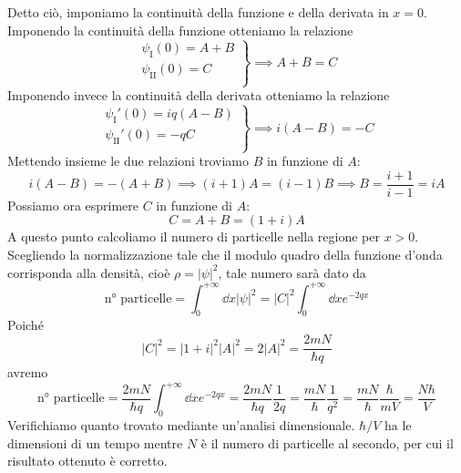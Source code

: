 \begin{soluzione}
   Detto ciò, imponiamo la continuità della funzione e della derivata in $x=0$. Imponendo la continuità della funzione otteniamo la relazione
   \begin{equation*}
      \left.
      \begin{aligned}
         \psi_{\text{I}}(0)=A+B\\
         \psi_{\text{II}}(0)=C\\
    \end{aligned}
    \right\}
    \implies
    A+B=C
  \end{equation*}
  Imponendo invece la continuità della derivata otteniamo la relazione
   \begin{equation*}
      \left.
      \begin{aligned}
         \psi_{\text{I}}'(0)=iq(A-B)\\
         \psi_{\text{II}}'(0)=-qC\\
      \end{aligned}
      \right\}
    \implies
    i(A-B)=-C
  \end{equation*}
  Mettendo insieme le due relazioni troviamo $B$ in funzione di $A$:
  \begin{equation*}
      i(A - B)=-(A + B)
      \implies
      (i + 1)A=(i - 1)B
      \implies
      B=\frac{i + 1}{i - 1}=iA
  \end{equation*}
  Possiamo ora esprimere $C$ in funzione di $A$:
  \begin{equation*}
   C=A+B=(1+i)A
  \end{equation*}
   A questo punto calcoliamo il numero di particelle nella regione per $x>0$. Scegliendo la normalizzazione tale che il modulo quadro della funzione d'onda corrisponda alla densità, cioè $\rho=|\psi|^2$, tale numero sarà dato da
   \begin{equation*}
      \text{n° particelle}
      =\int_{0}^{+\infty} \dd{x} |\psi|^2
      =|C|^2 \int_{0}^{+\infty} \dd{x} e^{-2qx}
   \end{equation*}
   Poiché
   \begin{equation*}
      |C|^2
      =|1+i|^2|A|^2
      =2|A|^2
      =\frac{2mN}{\hbar q}
   \end{equation*}
   avremo
   \begin{equation*}
      \text{n° particelle}
      =\frac{2mN}{\hbar q} \int_{0}^{+\infty} \dd{x} e^{-2qx}
      =\frac{2mN}{\hbar q} \frac{1}{2q}
      =\frac{mN}{\hbar} \frac{1}{q^2}
      =\frac{mN}{\hbar} \frac{\hbar}{mV}
      =\frac{N\hbar}{V}
   \end{equation*}
   Verifichiamo quanto trovato mediante un'analisi dimensionale. $\hbar/V$ ha le dimensioni di un tempo mentre $N$ è il numero di particelle al secondo, per cui il risultato ottenuto è corretto.
\end{soluzione}